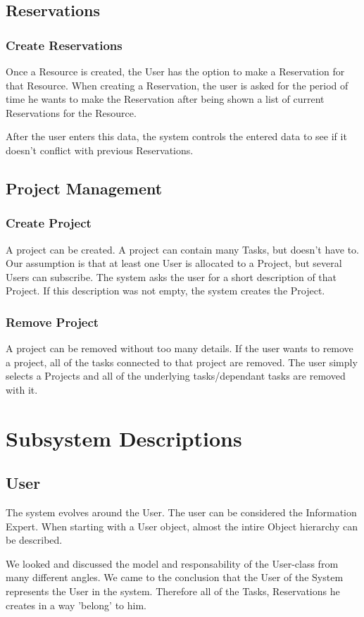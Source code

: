 \documentclass[a4paper,11pt]{article}
\begin{document}
		\subsection{Reservations}
			\subsubsection{Create Reservations}
			Once a Resource is created, the User has the option to make a Reservation for that Resource.
			When creating a Reservation, the user is asked for the period of time he wants to make the Reservation after being shown a list of current Reservations for the Resource.

			After the user enters this data, the system controls the entered data to see if it doesn't conflict with previous Reservations.
		\subsection{Project Management}
			\subsubsection{Create Project}
			A project can be created. A project can contain many Tasks, but doesn't have to. Our assumption is that at least one User is allocated to a Project, but several Users can subscribe.
			The system asks the user for a short description of that Project. If this description was not empty, the system creates the Project.
			\subsubsection{Remove Project}
			A project can be removed without too many details. If the user wants to remove a project, all of the tasks connected to that project are removed. The user simply selects a Projects and all of the underlying tasks/dependant tasks are removed with it.
	\section{Subsystem Descriptions}
		\subsection{User}
		The system evolves around the User. The user can be considered the Information Expert.
		When starting with a User object, almost the intire Object hierarchy can be described.

		We looked and discussed the model and responsability of the User-class from many different angles. We came to the conclusion that the User of the System represents the User in the system. Therefore all of the Tasks, Reservations he creates in a way 'belong' to him.
\end{document}
